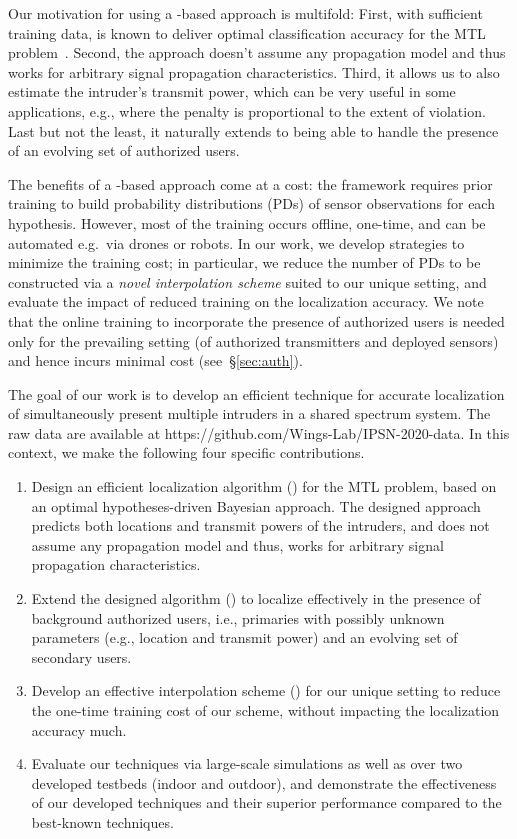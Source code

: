   Our motivation for using a \map-based
approach is multifold: First, with sufficient training data, \map is
known to deliver optimal classification accuracy for the MTL problem~\cite{map-optimal}.
Second, the \map approach doesn't assume any propagation model and
thus works for arbitrary signal propagation characteristics. Third, it
allows us to also estimate the intruder's transmit power, which can be
very useful in some applications, e.g., where the penalty is
proportional to the extent of violation. Last but not the least,
it naturally extends to being able to handle the presence of an evolving
set of authorized users.

  The benefits of a \map-based
approach come at a cost: the \map framework requires prior training to
build probability distributions (PDs) of sensor observations for each
hypothesis. However, most of the training occurs offline, one-time,
and can be automated e.g.\ via drones or robots.  In our work, we
develop strategies to minimize the training cost; in particular, we
reduce the number of PDs to be constructed via a {\em novel interpolation
scheme} suited to our unique setting, and evaluate the impact of
reduced training on the localization accuracy.
We note that the online training to incorporate the presence of authorized
users is needed only for the prevailing setting (of authorized
transmitters and deployed sensors) and hence incurs minimal cost
(see~\S\ref{sec:auth}).

  The goal of our work is to develop an
efficient technique for accurate localization of simultaneously
present multiple intruders in a shared spectrum system. The raw data are available at https://github.com/Wings-Lab/IPSN-2020-data. In this
context, we make the following four specific contributions. 
\begin{enumerate}
\item
Design an efficient localization algorithm (\ouralgo) for the MTL
problem, based on an optimal hypotheses-driven Bayesian approach. The
designed approach predicts both locations and transmit powers of the
intruders, and does not assume any propagation model and thus, works
for arbitrary signal propagation characteristics.

\item
Extend the designed algorithm (\ouralgoss) to localize effectively in
the presence of background authorized users, i.e., primaries with
possibly unknown parameters (e.g., location and transmit power) and an
evolving set of secondary users.

\item
Develop an effective interpolation scheme (\ildw) for our unique
setting to reduce the one-time training cost of our scheme, without
impacting the localization accuracy much.

\item
Evaluate our techniques via large-scale simulations as well as over
two developed testbeds (indoor and outdoor), and demonstrate the
effectiveness of our developed techniques and their superior
performance compared to the best-known techniques.
\end{enumerate}

